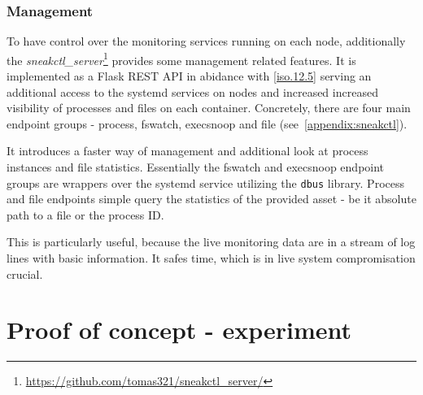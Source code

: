 \subsubsection*{Management \label{implementation:mon:hunting:mgmt}}
To have control over the monitoring services running on each node, additionally the \textit{sneakctl\_server}\footnote{\url{https://github.com/tomas321/sneakctl_server/}} provides some management related features. It is implemented as a Flask REST API in abidance with \ref{iso.12.5} serving an additional access to the systemd services on nodes and increased increased visibility of processes and files on each container. Concretely, there are four main endpoint groups - process, fswatch, execsnoop and file (see~\autoref{appendix:sneakctl}).

It introduces a faster way of management and additional look at process instances and file statistics. Essentially the fswatch and execsnoop endpoint groups are wrappers over the systemd service utilizing the \texttt{dbus} library. Process and file endpoints simple query the statistics of the provided asset - be it absolute path to a file or the process ID.

This is particularly useful, because the live monitoring data are in a stream of log lines with basic information. It safes time, which is in live system compromisation crucial.

\section{Proof of concept - experiment \label{implementation:poc}}
